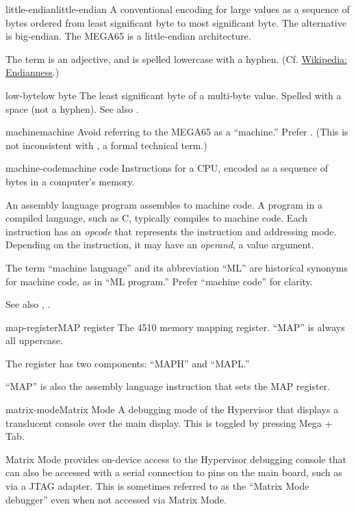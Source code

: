 \begin{sgentry}{little-endian}{little-endian}
    A conventional encoding for large values as a sequence of bytes ordered from least significant byte to most significant byte. The alternative is big-endian. The MEGA65 is a little-endian architecture.

    The term is an adjective, and is spelled lowercase with a hyphen. (Cf. \href{https://en.wikipedia.org/wiki/Endianness}{Wikipedia: Endianness}.)
\end{sgentry}

\begin{sgentry}{low-byte}{low byte}
    The least significant byte of a multi-byte value. Spelled with a space (not a hyphen). See also .
\end{sgentry}

\begin{sgentry}{machine}{machine}
    Avoid referring to the MEGA65 as a ``machine.'' Prefer . (This is not inconsistent with , a formal technical term.)
\end{sgentry}

\begin{sgentry}{machine-code}{machine code}
    Instructions for a CPU, encoded as a sequence of bytes in a computer's memory.

    An assembly language program assembles to machine code. A program in a compiled language, such as C, typically compiles to machine code. Each instruction has an \emph{opcode} that represents the instruction and addressing mode. Depending on the instruction, it may have an \emph{operand}, a value argument.

    The term ``machine language'' and its abbreviation ``ML'' are historical synonyms for machine code, as in ``ML program.'' Prefer ``machine code'' for clarity.

    See also , .
\end{sgentry}

\begin{sgentry}{map-register}{MAP register}
    The 4510 memory mapping register. ``MAP'' is always all uppercase.

    The register has two components: ``MAPH'' and ``MAPL.''

    ``MAP'' is also the assembly language instruction that sets the MAP register.
\end{sgentry}

\begin{sgentry}{matrix-mode}{Matrix Mode}
    A debugging mode of the Hypervisor that displays a translucent console over the main display. This is toggled by pressing Mega + Tab.

    Matrix Mode provides on-device access to the Hypervisor debugging console that can also be accessed with a serial connection to pins on the main board, such as via a JTAG adapter. This is sometimes referred to as the ``Matrix Mode debugger'' even when not accessed via Matrix Mode.
\end{sgentry}

